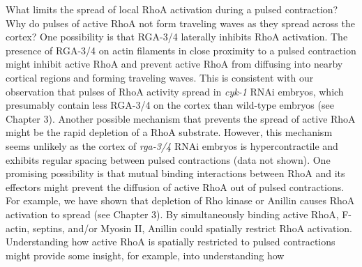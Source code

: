 \documentclass{ucetd}
\begin{document}
What limits the spread of local RhoA activation during a pulsed contraction?  Why do pulses of active RhoA not form traveling waves as they spread across the cortex?  One possibility is that RGA-3/4 laterally inhibits RhoA activation.  The presence of RGA-3/4 on actin filaments in close proximity to a pulsed contraction might inhibit active RhoA and prevent active RhoA from diffusing into nearby cortical regions and forming traveling waves.  This is consistent with our observation that pulses of RhoA activity spread in \textit{cyk-1} RNAi embryos, which presumably contain less RGA-3/4 on the cortex than wild-type embryos (see Chapter 3).  Another possible mechanism that prevents the spread of active RhoA might be the rapid depletion of a RhoA substrate.  However, this mechanism seems unlikely as the cortex of \textit{rga-3/4} RNAi embryos is hypercontractile and exhibits regular spacing between pulsed contractions (data not shown).  One promising possibility is that mutual binding interactions between RhoA and its effectors might prevent the diffusion of active RhoA out of pulsed contractions.  For example, we have shown that depletion of Rho kinase or Anillin causes RhoA activation to spread (see Chapter 3).  By simultaneously binding active RhoA, F-actin, septins, and/or Myosin II, Anillin could spatially restrict RhoA activation.  Understanding how active RhoA is spatially restricted to pulsed contractions might provide some insight, for example, into understanding how   
\end{document}
